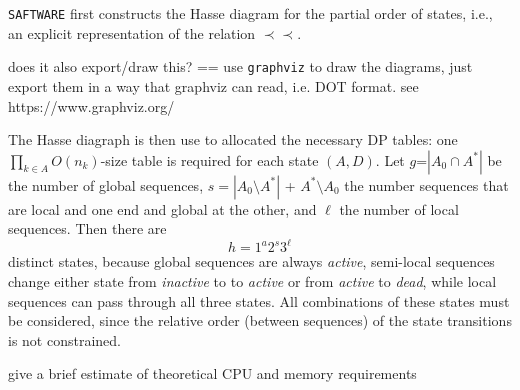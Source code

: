 \documentclass[a4paper,10pt]{article}
\newcommand{\TODO}[1]{\begingroup\color{red}#1\endgroup}
\newcommand{\pprec}{\mathrel{\prec\!\!\!\prec}}
\newcommand{\SAFTWARE}{\TODO{\texttt{SAFTWARE}}}
\begin{document}
\SAFTWARE{} first constructs the Hasse diagram for the partial order
of states, i.e., an explicit representation of the relation $\pprec$.

\TODO{does it also export/draw this? == use \texttt{graphviz} to draw the
  diagrams, just export them in a way that graphviz can read, i.e. DOT
  format. see https://www.graphviz.org/}

The Hasse diagraph is then use to allocated the necessary DP tables: one
$\prod_{k\in A} O(n_k)$-size table is required for each state $(A,D)$.  Let
$g$=$|A_0\cap A^*|$ be the number of global sequences,
$s=|A_0\setminus A^*|$ + $A^*\setminus A_0$ the number sequences that are
local and one end and global at the other, and $\ell$ the number of local
sequences. Then there are
\begin{equation}
  h = 1^a 2^s 3^{\ell} 
\end{equation} 
distinct states, because global sequences are always \textit{active},
semi-local sequences change either state from \textit{inactive} to to
\textit{active} or from \textit{active} to \textit{dead}, while local
sequences can pass through all three states. All combinations of these
states must be considered, since the relative order (between sequences) of
the state transitions is not constrained.





\TODO{give a brief estimate of theoretical CPU and memory requirements}
\end{document}
